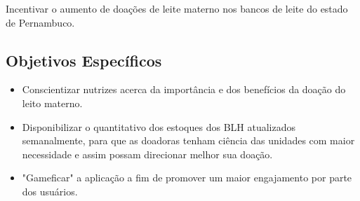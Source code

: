 Incentivar o aumento de doações de leite materno nos bancos de leite do estado de Pernambuco.


\subsection{Objetivos Específicos}

\begin{itemize}
  \item Conscientizar nutrizes acerca da importância e dos benefícios da doação do leito materno.
  \item Disponibilizar o quantitativo dos estoques dos BLH atualizados semanalmente, para que as doadoras tenham ciência das unidades com maior necessidade e assim possam direcionar melhor sua doação.
  \item "Gameficar" a aplicação a fim de promover um maior engajamento por parte dos usuários.
\end{itemize}


 